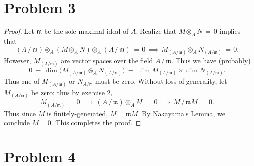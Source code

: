 \documentclass[11pt]{article}
\begin{document}
\section{Problem 3}

\begin{proof}
  Let $\mathfrak{m}$ be the sole maximal ideal of $A$. Realize that $M \otimes_{A} N \, = \, 0$ implies that 
  \[
    (A \, / \, \mathfrak{m}) \otimes_{A} (M \otimes_{A} N) \otimes_{A} (A \, / \, \mathfrak{m}) \, = \, 0 \, \implies \, M_{(A / \mathfrak{m})} \otimes_{A} N_{(A / \mathfrak{m})} \, = \, 0.
  \]
  However, $M_{(A / \mathfrak{m})}$ are vector spaces over the field $A \, / \, \mathfrak{m}$. Thus we have (probably)
  \[
    0 \, = \, \dim \big( M_{(A / \mathfrak{m})} \otimes_{A} N_{(A / \mathfrak{m})} \big) \, = \, \dim M_{(A / \mathfrak{m})} \times \dim N_{(A / \mathfrak{m})}.
  \]
  Thus one of $M_{(A / \mathfrak{m})}$ or $N_{A / \mathfrak{m}}$ must be zero. Without loss of generality, let $M_{(A / \mathfrak{m})}$ be zero; thus by exercise 2,
  \[
    M_{(A / \mathfrak{m})} \, = \, 0 \, \implies \, (A \, / \, \mathfrak{m}) \otimes_{A} M \, = \, 0 \, \implies \, M \, / \, \mathfrak{m} M \, = \, 0.
  \]
  Thus since $M$ is finitely-generated, $M = \mathfrak{m} M$. By Nakayama's Lemma, we conclude $M = 0$. This completes the proof.
\end{proof}


\section{Problem 4}
\end{document}
